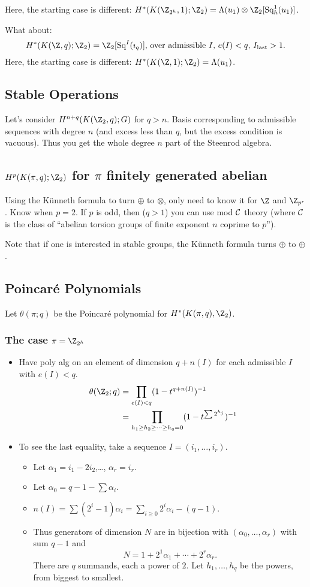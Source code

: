 \documentclass[11pt]{article}
\begin{document}
\begin{SerreCohModTwoEilMacLane}
\begin{itemise}
Here, the starting case is different: $H^*(K(\Z_{2^h},1);\Z_2)=\Lambda(u_1)\otimes \Z_2[\Squ_h^1(u_1)]$.
\item What about:
\[\text{$H^*(K(\Z,q);\Z_2)=\Z_2[\Squ^I(\imath_q)]$, over admissible $I$, $e(I)<q$, $I_\text{last}>1$.}\]
Here, the starting case is different: $H^*(K(\Z,1);\Z_2)=\Lambda(u_1)$.
\end{itemise}
\subsection*{Stable Operations}
Let's consider $H^{n+q}(K(\Z_2,q);G)$ for $q>n$. Basis corresponding to admissible sequences with degree $n$ (and excess less than $q$, but the excess condition is vacuous). Thus you get the whole degree $n$ part of the Steenrod algebra.
\subsection*{$H^p(K(\pi,q);\Z_2)$ for $\pi$ finitely generated abelian}
Using the K\"unneth formula to turn $\oplus$ to $\otimes$, only need to know it for $\Z$ and $\Z_{p^r}$. Know when $p=2$. If $p$ is odd, then ($q>1$) you can use mod $\mathcal{C}$ theory (where $\mathcal{C}$ is the class of ``abelian torsion groups of finite exponent $n$ coprime to $p$'').

Note that if one is interested in stable groups, the K\"unneth formula turns $\oplus$ to $\oplus$.
\subsection*{Poincar\'e Polynomials}
Let $\theta(\pi;q)$ be the Poincar\'e polynomial for $H^*(K(\pi,q),\Z_2)$.
\subsubsection*{The case $\pi=\Z_{2^h}$}
\begin{itemize}\squishlist
\item Have poly alg on an element of dimension $q+n(I)$ for each admissible $I$ with $e(I)<q$.
\begin{align*}
\theta(\Z_2;q)&=\prod_{e(I)<q}(1-t^{q+n(I)})^{-1}\\
&=\prod_{h_1\geq h_2\geq\cdots\geq h_{q}=0}(1-t^{\sum2^{h_j}})^{-1}
\end{align*}
\item To see the last equality, take a sequence $I=(i_1,\ldots,i_r)$.
\begin{itemize}\squishlist
\item Let $\alpha_1=i_1-2i_2$,\ldots, $\alpha_r=i_r$.
\item Let $\alpha_0=q-1-\sum\alpha_i$.
\item $n(I)=\sum (2^i-1)\alpha_i=\sum_{i\geq0} 2^i\alpha_i-(q-1)$.
\item Thus generators of dimension $N$ are in bijection with $(\alpha_0,\ldots,\alpha_r)$ with sum $q-1$ and
\[N=1+2^1\alpha_1+\cdots+2^r\alpha_r.\]
There are $q$ summands, each a power of $2$. Let $h_1,\ldots, h_q$ be the powers, from biggest to smallest.
\end{itemize}
\end{itemize}

\end{SerreCohModTwoEilMacLane}
\end{document}
